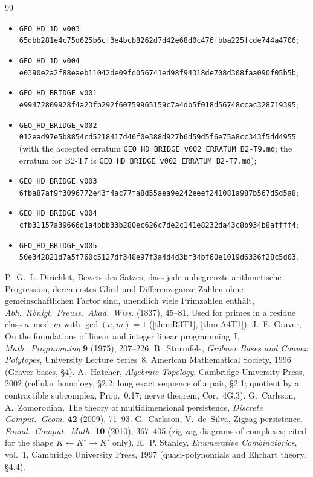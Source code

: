 \begin{thebibliography}{99}
\begin{itemize}[leftmargin=1.4em,itemsep=1pt,topsep=2pt]
\item\texttt{GEO\_HD\_1D\_v003} \texttt{65dbb281e4c75d625b6cf3e4bcb8262d7d42e68d0c476fbba225fcde744a4706};
\item\texttt{GEO\_HD\_1D\_v004} \texttt{e0390e2a2f88eaeb11042de09fd056741ed98f94318de708d308faa090f05b5b};
\item\texttt{GEO\_HD\_BRIDGE\_v001} \texttt{e99472809928f4a23fb292f60759965159c7a4db5f018d56748ccac328719395};
\item\texttt{GEO\_HD\_BRIDGE\_v002} \texttt{012ead97e5b8854cd5218417d46f0e388d927b6d59d5f6e75a8cc343f5dd4955} (with the accepted erratum \texttt{GEO\_HD\_BRIDGE\_v002\_ERRATUM\_B2-T9.md}; the erratum for B2-T7 is \texttt{GEO\_HD\_BRIDGE\_v002\_ERRATUM\_B2-T7.md});
\item\texttt{GEO\_HD\_BRIDGE\_v003} \texttt{6fba87af9f3096772e43f4ac77fa8d55aea9e242eeef241081a987b567d5d5a8};
\item\texttt{GEO\_HD\_BRIDGE\_v004} \texttt{cfb31157a39666d1a4bbb33b280ec626c7de2c141e8232da43c8b934b8affff4};
\item\texttt{GEO\_HD\_BRIDGE\_v005} \texttt{50e342821d7a5f760c5127df348e97f3a4d4d3bf34bf60e1019d6336f28c5d03}.
\end{itemize}
 P.~G.~L. Dirichlet, Beweis des Satzes, dass jede unbegrenzte arithmetische Progression, deren erstes Glied und Differenz ganze Zahlen ohne gemeinschaftlichen Factor sind, unendlich viele Primzahlen enth\"alt, \emph{Abh.\ K\"onigl.\ Preuss.\ Akad.\ Wiss.} (1837), 45--81. Used for primes in a residue class $a\bmod m$ with $\gcd(a,m)=1$ (\cref{thm:R3T1}, \cref{thm:A4T1}).
 J.~E. Graver, On the foundations of linear and integer linear programming~I, \emph{Math.\ Programming} \textbf{9} (1975), 207--226.
 B.~Sturmfels, \emph{Gr\"obner Bases and Convex Polytopes}, University Lecture Series~8, American Mathematical Society, 1996 (Graver bases, \S4).
 A.~Hatcher, \emph{Algebraic Topology}, Cambridge University Press, 2002 (cellular homology, \S2.2; long exact sequence of a pair, \S2.1; quotient by a contractible subcomplex, Prop.~0.17; nerve theorem, Cor.~4G.3).
 G.~Carlsson, A.~Zomorodian, The theory of multidimensional persistence, \emph{Discrete Comput.\ Geom.} \textbf{42} (2009), 71--93.
 G.~Carlsson, V.~de~Silva, Zigzag persistence, \emph{Found.\ Comput.\ Math.} \textbf{10} (2010), 367--405 (zig-zag diagrams of complexes; cited for the shape $K\leftarrow K^\circ\to K'$ only).
 R.~P. Stanley, \emph{Enumerative Combinatorics}, vol.~1, Cambridge University Press, 1997 (quasi-polynomials and Ehrhart theory, \S4.4).

\end{thebibliography}
